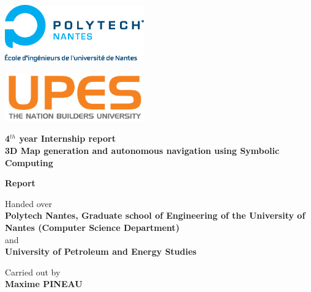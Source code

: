 
\begin{titlepage}	%

\begin{center}


\begin{minipage}[t]{0.48\textwidth}
	\begin{flushleft}
		\includegraphics [width=60mm]{images/logo_ecoles/Polytech_Nantes_Universite} \\[0.5cm]
	\end{flushleft}
\end{minipage}
\begin{minipage}[t]{0.48\textwidth}
	\begin{flushright}
		\includegraphics [width=60mm]{images/upes} \\[0.5cm]
	\end{flushright}
\end{minipage} 

\vfill

\Huge{\textbf{4$^{th}$ year Internship report}} \\
\huge{\textbf{3D Map generation and autonomous navigation using Symbolic Computing}}

\vfill 

\huge{\textbf{Report}} 

\vfill

\Large{Handed over} \\
\LARGE{\textbf{Polytech Nantes, Graduate school of Engineering of the University of Nantes (Computer Science Department)}} \\ 
\Large{and} \\
\LARGE{\textbf{University of Petroleum and Energy Studies}}


\vfill 

\Large{Carried out by} \\
\Large{\textbf{Maxime PINEAU}} 


\end{center}
\end{titlepage}
